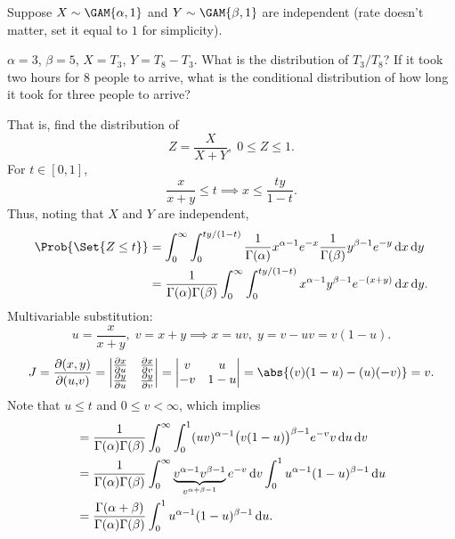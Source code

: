 \begin{Example}{}{}
    Suppose $ X \sim \GAM{\alpha,1} $ and
    $ Y \sim \GAM{\beta,1} $
    are independent (rate doesn't matter, set it equal to $1$
    for simplicity).
    \begin{Example}{}{}
        $ \alpha=3 $, $ \beta=5 $, $ X=T_3 $, $ Y=T_8-T_3 $.
        What is the distribution of $ T_3/T_8 $?
        If it took two hours for 8 people to arrive, what is the
        conditional distribution of how long it took for three people to arrive?
    \end{Example}
    That is, find the distribution of
    \[ Z=\frac{X}{X+Y},\; 0\le Z\le 1. \]
    For $ t\in[0,1] $,
    \[ \frac{x}{x+y}\le t\implies x\le \frac{ty}{1-t}. \]
    Thus, noting that $ X $ and $ Y $ are independent,
    \begin{align*}
        \Prob{\Set{Z\le t}}
         & =\int_{0}^{\infty}\int_{0}^{ty/(1-t)}
        \frac{1}{\Gamma(\alpha)}x^{\alpha-1}e^{-x}\frac{1}{\Gamma(\beta)} y^{\beta-1}e^{-y}\odif{x}\odif{y} \\
         & =\frac{1}{\Gamma(\alpha)\Gamma(\beta)}\int_{0}^{\infty}\int_{0}^{ty/(1-t)}
        x^{\alpha-1}y^{\beta-1}e^{-(x+y)}\odif{x}\odif{y}.
    \end{align*}
    Multivariable substitution:
    \[ u=\frac{x}{x+y},\; v=x+y\implies x=uv,\; y=v-uv=v(1-u). \]
    \[ J=\pdv{(x,y)}{(u{,}v)}=\begin{vmatrix}
            \pdv{x}{u} & \pdv{x}{v} \\
            \pdv{y}{u} & \pdv{y}{v}
        \end{vmatrix}=\begin{vmatrix}
            v  & u   \\
            -v & 1-u
        \end{vmatrix}=\abs{(v)(1-u)-(u)(-v)}=v. \]
    Note that $ u\le t $ and $ 0\le v<\infty $, which implies
    \begin{align*}
         & =\frac{1}{\Gamma(\alpha)\Gamma(\beta)}\int_{0}^{\infty}\int_{0}^{1}
        (uv)^{\alpha-1}\bigl(v(1-u)\bigr)^{\beta-1}e^{-v}v\odif{u}\odif{v}                                                                       \\
         & =\frac{1}{\Gamma(\alpha)\Gamma(\beta)}
        \int_{0}^{\infty}\underbrace{v^{\alpha-1}v^{\beta-1}}_{v^{\alpha+\beta-1}} e^{-v}\odif{v}\int_{0}^{1}u^{\alpha-1}(1-u)^{\beta-1}\odif{u} \\
         & =\frac{\Gamma(\alpha+\beta)}{\Gamma(\alpha)\Gamma(\beta)}\int_{0}^{1}u^{\alpha-1}(1-u)^{\beta-1}\odif{u}.
    \end{align*}
\end{Example}
